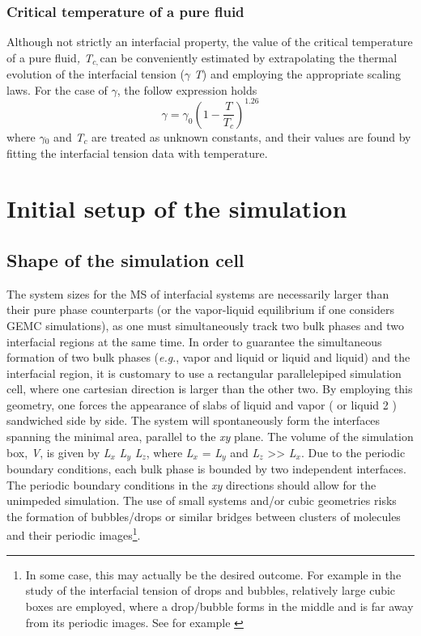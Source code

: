 \documentclass[9pt,bestpractices]{livecoms}
\begin{document}
\subsubsection{Critical temperature of a pure fluid}

Although not strictly an interfacial property, the value of the critical
temperature of a pure fluid\textit{, T}$_{c, }$can be conveniently estimated by
extrapolating the thermal evolution of the interfacial tension (${\gamma}$
\textendash{} \textit{T}) and employing the appropriate scaling laws. For the
case of ${\gamma}$, the follow expression holds\citep{evans1992}
\begin{equation}
\gamma=\gamma_{0}\left(1-\frac{T}{T_{c}}\right)^{1.26}
\end{equation}
where ${\gamma}$$_{0}$ and \textit{T}$_{c}$ are treated as unknown constants,
and their values are found by fitting the interfacial tension data with
temperature.

\section{Initial setup of the simulation}

\subsection{Shape of the simulation cell}

The system sizes for the MS of interfacial systems are necessarily larger than
their pure phase counterparts (or the vapor-liquid equilibrium if one considers
GEMC simulations), as one must simultaneously track two bulk phases and two
interfacial regions at the same time. In order to guarantee the simultaneous
formation of two bulk phases (\textit{e.g}., vapor and liquid or liquid and
liquid) and the interfacial region, it is customary to use a rectangular
parallelepiped simulation cell, where one cartesian direction is larger than
the other two. By employing this geometry, one forces the appearance of slabs
of liquid and vapor ( or liquid 2 ) sandwiched side by side. The system will
spontaneously form the interfaces spanning the minimal area, parallel to the
\textit{xy} plane. The volume of the simulation box, \textit{V}, is given by
\textit{L}$_{x}$ \textit{L}$_{y}$ \textit{L}$_{z}$, where \textit{L}$_{x}$
= \textit{L}$_{y}$ and \textit{L}$_{z}$ {\textgreater}{\textgreater}
\textit{L}$_{x}$. Due to the periodic boundary conditions, each bulk phase is
bounded by two independent interfaces. The periodic boundary conditions in the
\textit{xy} directions should allow for the unimpeded simulation. The use of
small systems and/or cubic geometries risks the formation of bubbles/drops or
similar bridges between clusters of molecules and their periodic
images\footnote{In some case, this may actually be the desired outcome.
For example in the study of the interfacial tension of drops and bubbles,
relatively large cubic boxes are employed, where a drop/bubble forms in the
middle and is far away from its periodic images. See for example \citep{lau2015}}.
\end{document}
